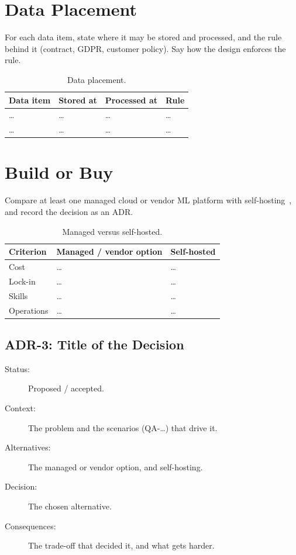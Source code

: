 \documentclass[report]{itvest}
\begin{document}
\section{Data Placement}

For each data item, state where it may be stored and processed, and the
rule behind it (contract, GDPR, customer policy). Say how the design
enforces the rule.

\begin{table}[h]
  \centering
  \begin{tabularx}{\textwidth}{XXXX}
    \toprule
    Data item & Stored at & Processed at & Rule \\
    \midrule
    \ldots & \ldots & \ldots & \ldots \\
    \ldots & \ldots & \ldots & \ldots \\
    \bottomrule
  \end{tabularx}
  \caption{Data placement.}
  \label{tab:data-placement}
\end{table}

\section{Build or Buy}

Compare at least one managed cloud or vendor ML platform with
self-hosting~\cite{bass_engineering_2025}, and record the decision as an
ADR.

\begin{table}[h]
  \centering
  \begin{tabularx}{\textwidth}{lXX}
    \toprule
    Criterion & Managed / vendor option & Self-hosted \\
    \midrule
    Cost & \ldots & \ldots \\
    Lock-in & \ldots & \ldots \\
    Skills & \ldots & \ldots \\
    Operations & \ldots & \ldots \\
    \bottomrule
  \end{tabularx}
  \caption{Managed versus self-hosted.}
  \label{tab:build-buy}
\end{table}

\subsection{ADR-3: Title of the Decision}

\begin{description}
  \item[Status:] Proposed / accepted.
  \item[Context:] The problem and the scenarios (QA-\ldots) that drive it.
  \item[Alternatives:] The managed or vendor option, and self-hosting.
  \item[Decision:] The chosen alternative.
  \item[Consequences:] The trade-off that decided it, and what gets harder.
\end{description}
\end{document}
